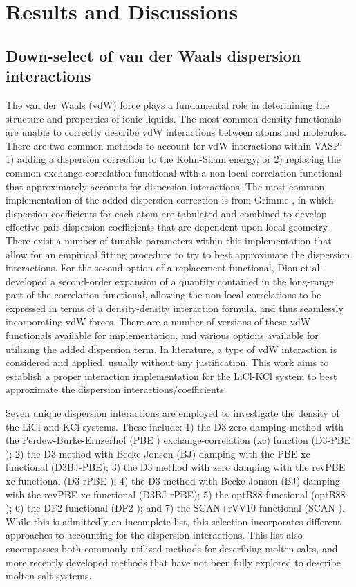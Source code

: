 \documentclass[review]{elsarticle}
\begin{document}
\FloatBarrier

\section{Results and Discussions}

\subsection{Down-select of van der Waals dispersion interactions}

The van der Waals (vdW) force plays a fundamental role in determining the structure and properties of ionic liquids. The most common density functionals are unable to correctly describe vdW interactions between atoms and molecules.  There are two common methods to account for vdW interactions within VASP: 1) adding a dispersion correction to the Kohn-Sham energy, or 2) replacing the common exchange-correlation functional with a non-local correlation functional that approximately accounts for dispersion interactions. The most common implementation of the added dispersion correction is from Grimme \cite{Grimme2006,Grimme2010}, in which dispersion coefficients for each atom are tabulated and combined to develop effective pair dispersion coefficients that are dependent upon local geometry. There exist a number of tunable parameters within this implementation that allow for an empirical fitting procedure to try to best approximate the dispersion interactions. For the second option of a replacement functional, Dion et al.\cite{Dion2004} developed a second-order expansion of a quantity contained in the long-range part of the correlation functional, allowing the non-local correlations to be expressed in terms of a density-density interaction formula, and thus seamlessly incorporating vdW forces. There are a number of versions of these vdW functionals available for implementation, and various options available for utilizing the added dispersion term. In literature, a type of vdW interaction is considered and applied, usually without any justification. This work aims to establish a proper interaction implementation for the LiCl-KCl system to best approximate the dispersion interactions/coefficients. 

Seven unique dispersion interactions are employed to investigate the density of the LiCl and KCl systems. These include: 1) the D3 zero damping method with the Perdew-Burke-Ernzerhof (PBE \cite{perdew1996}) exchange-correlation (xc) function (D3-PBE \cite{Grimme2010}); 2) the D3 method with Becke-Jonson (BJ) damping with the PBE xc functional (D3BJ-PBE); 3) the D3 method with zero damping with the revPBE xc functional (D3-rPBE \cite{zhang1998}); 4) the D3 method with Becke-Jonson (BJ) damping with the revPBE xc functional (D3BJ-rPBE); 5) the optB88 functional (optB88 \cite{klimevs2009chemical}); 6) the DF2 functional (DF2 \cite{lee2010}); and 7) the SCAN+rVV10 functional (SCAN \cite{peng2016}). While this is admittedly an incomplete list, this selection incorporates different approaches to accounting for the dispersion interactions. This list also encompasses both commonly utilized methods for describing molten salts, and more recently developed methods that have not been fully explored to describe molten salt systems. 
\end{document}
